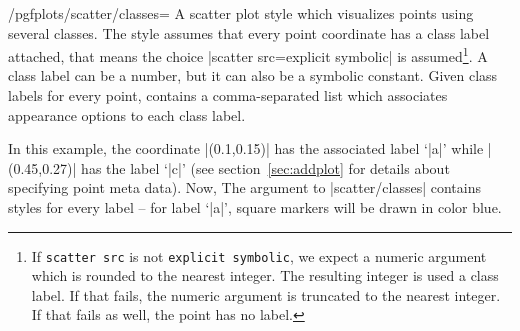 \label{pgfplots:scatterclasses}
\begin{stylekey}{/pgfplots/scatter/classes=}
	A scatter plot style which visualizes points using several classes. The style assumes that every point coordinate has a class label attached, that means the choice |scatter src=explicit symbolic| is assumed\footnote{If \texttt{scatter src} is not \texttt{explicit symbolic}, we expect a numeric argument which is rounded to the nearest integer. The resulting integer is used a class label. If that fails, the numeric argument is truncated to the nearest integer. If that fails as well, the point has no label.}. A class label can be a number, but it can also be a symbolic constant. Given class labels for every point,  contains a comma-separated list which associates appearance options to each class label.

\begin{codeexample}[]
\end{codeexample}
In this example, the coordinate |(0.1,0.15)| has the associated label `|a|' while |(0.45,0.27)| has the label `|c|' (see section~\ref{sec:addplot} for details about specifying point meta data). Now, The argument to |scatter/classes| contains styles for every label -- for label `|a|', square markers will be drawn in color blue. 

\begin{codeexample}
\end{codeexample}


\end{stylekey}
